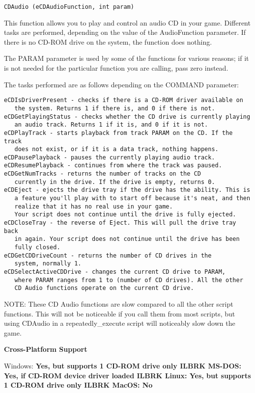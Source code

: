 \begin{verbatim}
CDAudio (eCDAudioFunction, int param)
\end{verbatim}
This function allows you to play and control an audio CD in your game.
Different tasks are performed, depending on the value of the AudioFunction
parameter. If there is no CD-ROM drive on the system, the function does
nothing.

The PARAM parameter is used by some of the functions for various reasons; if
it is not needed for the particular function you are calling, pass zero
instead.

The tasks performed are as follows depending on the COMMAND parameter:
\begin{verbatim}
eCDIsDriverPresent - checks if there is a CD-ROM driver available on
   the system. Returns 1 if there is, and 0 if there is not.
eCDGetPlayingStatus - checks whether the CD drive is currently playing
   an audio track. Returns 1 if it is, and 0 if it is not.
eCDPlayTrack - starts playback from track PARAM on the CD. If the track
   does not exist, or if it is a data track, nothing happens.
eCDPausePlayback - pauses the currently playing audio track.
eCDResumePlayback - continues from where the track was paused.
eCDGetNumTracks - returns the number of tracks on the CD
   currently in the drive. If the drive is empty, returns 0.
eCDEject - ejects the drive tray if the drive has the ability. This is
   a feature you'll play with to start off because it's neat, and then
   realize that it has no real use in your game.
   Your script does not continue until the drive is fully ejected.
eCDCloseTray - the reverse of Eject. This will pull the drive tray back
   in again. Your script does not continue until the drive has been
   fully closed.
eCDGetCDDriveCount - returns the number of CD drives in the
   system, normally 1.
eCDSelectActiveCDDrive - changes the current CD drive to PARAM,
   where PARAM ranges from 1 to (number of CD drives). All the other
   CD Audio functions operate on the current CD drive.
\end{verbatim}
NOTE: These CD Audio functions are slow compared to all the other script
functions. This will not be noticeable if you call them from most scripts,
but using CDAudio in a repeatedly_execute script will noticeably slow down
the game.

\bf{Cross-Platform Support}

Windows: \bf{ Yes, but supports 1 CD-ROM drive only }ILBRK
MS-DOS: \bf{ Yes, if CD-ROM device driver loaded }ILBRK
Linux: \bf{ Yes, but supports 1 CD-ROM drive only }ILBRK
MacOS: \bf{ No }

